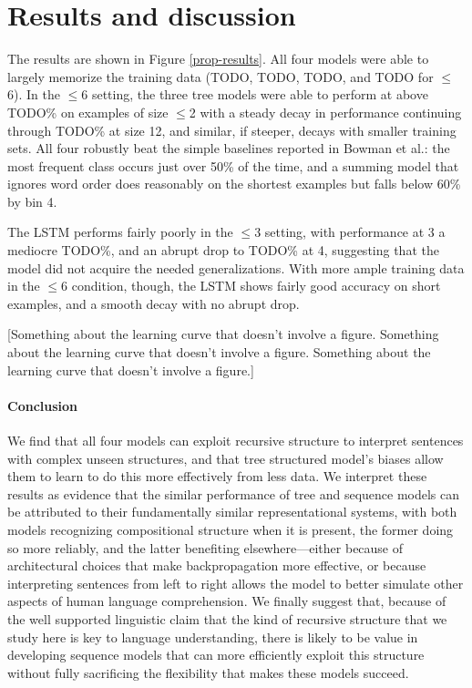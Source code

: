 \section{Results and discussion}\label{sec:discussion}

The results are shown in Figure \ref{prop-results}. All four models were able to largely memorize the training data (TODO, TODO, TODO, and TODO for $\le$6). In the $\le$6 setting, the three tree models were able to perform at above TODO\% on examples of size $\le$2 with a steady decay in performance continuing through TODO\% at size 12, and similar, if steeper, decays with smaller training sets. All four robustly beat the simple baselines reported in Bowman et al.: the most frequent class occurs just over 50\% of the time, and a summing model that ignores word order does reasonably on the shortest examples but falls below 60\% by bin 4.

The LSTM performs fairly poorly in the $\le3$ setting, with performance at 3 a mediocre TODO\%, and an abrupt drop to TODO\% at 4, suggesting that the model did not acquire the needed generalizations. With more ample training data in the $\le6$ condition, though, the LSTM shows fairly good accuracy on short examples, and a smooth decay with no abrupt drop. 

[Something about the learning curve that doesn't involve a figure. Something about the learning curve that doesn't involve a figure. Something about the learning curve that doesn't involve a figure.]

\paragraph{Conclusion}

We find that all four models can exploit recursive structure to interpret sentences with complex unseen structures, and that tree structured model's biases allow them to learn to do this more effectively from less data. 
We interpret these results as evidence that the similar performance of tree and sequence models can be attributed to their fundamentally similar representational systems, with both models recognizing compositional structure when it is present, the former doing so more reliably, and the latter benefiting elsewhere---either because of architectural choices that make backpropagation more effective, or because interpreting sentences from left to right allows the model to better simulate other aspects of human language comprehension. We finally suggest that, because of the well supported linguistic claim that the kind of recursive structure that we study here is key to language understanding, there is likely to be value in developing sequence models that can more efficiently exploit this structure without fully sacrificing the flexibility that makes these models succeed.
